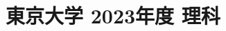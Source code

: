 ﻿\documentclass[../../uem_tok_q.tex]{subfiles}
\begin{document}
    \section{東京大学 2023年度 理科}
    \subsection{　}
    
    \vfill
    \subsection{　}
    
    \vfill
    \newpage
    \subsection{　}
    
    \vfill
    \subsection{　}
    
    \vfill
    \newpage
    \subsection{　}
    
    \vfill
    \subsection{　}
    
    \vfill
\end{document}
